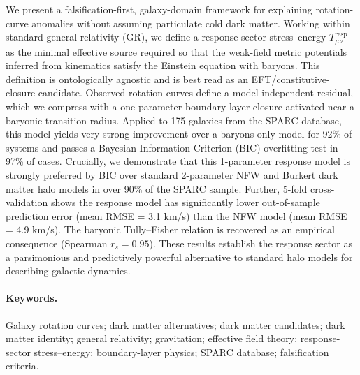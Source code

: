 We present a falsification-first, galaxy-domain framework for explaining rotation-curve anomalies without assuming particulate cold dark matter. Working within standard general relativity (GR), we define a response-sector stress--energy $T^{\mathrm{resp}}_{\mu\nu}$ as the minimal effective source required so that the weak-field metric potentials inferred from kinematics satisfy the Einstein equation with baryons. This definition is ontologically agnostic and is best read as an EFT/constitutive-closure candidate. Observed rotation curves define a model-independent residual, which we compress with a one-parameter boundary-layer closure activated near a baryonic transition radius. Applied to 175 galaxies from the SPARC database, this model yields very strong improvement over a baryons-only model for 92\% of systems and passes a Bayesian Information Criterion (BIC) overfitting test in 97\% of cases. Crucially, we demonstrate that this 1-parameter response model is strongly preferred by BIC over standard 2-parameter NFW and Burkert dark matter halo models in over 90\% of the SPARC sample. Further, 5-fold cross-validation shows the response model has significantly lower out-of-sample prediction error (mean RMSE = 3.1 km/s) than the NFW model (mean RMSE = 4.9 km/s). The baryonic Tully--Fisher relation is recovered as an empirical consequence (Spearman $r_s = 0.95$). These results establish the response sector as a parsimonious and predictively powerful alternative to standard halo models for describing galactic dynamics.

\paragraph{Keywords.}
Galaxy rotation curves; dark matter alternatives; dark matter candidates; dark matter identity; general relativity; gravitation; effective field theory; response-sector stress--energy; boundary-layer physics; SPARC database; falsification criteria.
